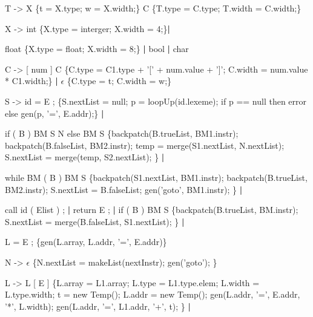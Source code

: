 \documentclass{ML}
\begin{document}
\begin{enumerate}
{    \item T -> X {\color{red}\{t = X.type; w = X.width;\}} C {\color{red}\{T.type = C.type; T.width = C.width;\}}
    \vspace{0.5cm}
    
    \item X -> int {\color{red}\{X.type = interger; X.width = 4;\}}\textbf{|} 
    
    \hspace{1cm}float {\color{red}\{X.type = float; X.width = 8;\}} \textbf{|}
         bool \textbf{|} char
    \vspace{0.5cm}
    
    \item C -> [ num ] C {\color{red}\{C.type = C1.type + '[' + num.value + ']'; C.width = num.value * C1.width;\}} \textbf{|}
         $\epsilon$ {\color{red}\{C.type = t; C.width = w;\}}
    
         \vspace{0.5cm}
    \item S -> id = E ; {\color{red}\{S.nextList = null; p = loopUp(id.lexeme); if p == null then error else gen(p, '=', E.addr);\}} \textbf{|}
    
    \hspace{1cm}if ( B ) BM S N else BM S {\color{red}\{backpatch(B.trueList, BM1.instr); backpatch(B.falseList, BM2.instr); temp = merge(S1.nextList, N.nextList); S.nextList = merge(temp, S2.nextList); \}} \textbf{|} 
    
    \hspace{1cm}while BM ( B ) BM S {\color{red}\{backpatch(S1.nextList, BM1.instr); backpatch(B.trueList, BM2.instr); S.nextList = B.falseList; gen('goto', BM1.instr); \}} \textbf{|} 
    
    \hspace{1cm}call id ( Elist ) ; \textbf{|} return E ; \textbf{|} if ( B ) BM S {\color{red}\{backpatch(B.trueList, BM.instr); S.nextList = merge(B.falseList, S1.nextList); \}} \textbf{|} 
    
    \hspace{1cm}L = E ; {\color{red}\{gen(L.array, L.addr, '=', E.addr)\}}
    \vspace{0.5cm}
    
    \item N -> $\epsilon$ {\color{red}\{N.nextList = makeList(nextInstr); gen('goto'); \}}
    
    \vspace{0.5cm}
    \item L -> L [ E ] {\color{red}\{L.array = L1.array; L.type = L1.type.elem; L.width = L.type.width; t = new Temp(); L.addr = new Temp(); gen(L.addr, '=', E.addr, '*', L.width); gen(L.addr, '=', L1.addr, '+', t); \}} \textbf{|} 
    
}
\end{enumerate}
\end{document}
